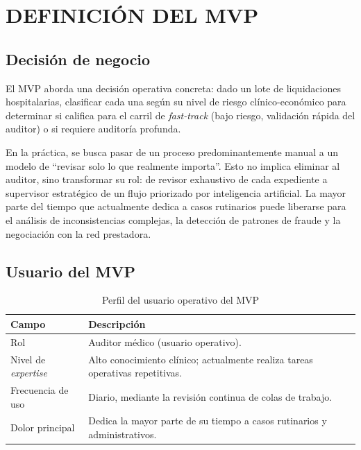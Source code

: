 
\chapter{DEFINICIÓN DEL MVP}

\section{Decisión de negocio}

El MVP aborda una decisión operativa concreta: dado un lote de liquidaciones hospitalarias, clasificar cada una según su nivel de riesgo clínico-económico para determinar si califica para el carril de \textit{fast-track} (bajo riesgo, validación rápida del auditor) o si requiere auditoría profunda.

En la práctica, se busca pasar de un proceso predominantemente manual a un modelo de “revisar solo lo que realmente importa”. Esto no implica eliminar al auditor, sino transformar su rol: de revisor exhaustivo de cada expediente a supervisor estratégico de un flujo priorizado por inteligencia artificial. La mayor parte del tiempo que actualmente dedica a casos rutinarios puede liberarse para el análisis de inconsistencias complejas, la detección de patrones de fraude y la negociación con la red prestadora.

\section{Usuario del MVP}
\begin{table}[H]
    \centering
    \caption{Perfil del usuario operativo del MVP}
    \label{tab:perfil-usuario-mvp}

    \begin{tabular}{
        p{}
        p{}
    }
        \toprule
        \textbf{Campo}
        & \textbf{Descripción} \\
        \midrule

        Rol
        & Auditor médico (usuario operativo). \\

        Nivel de \textit{expertise}
        & Alto conocimiento clínico; actualmente realiza tareas operativas repetitivas. \\

        Frecuencia de uso
        & Diario, mediante la revisión continua de colas de trabajo. \\

        Dolor principal
        & Dedica la mayor parte de su tiempo a casos rutinarios y administrativos. \\

        \bottomrule
    \end{tabular}
\end{table}


